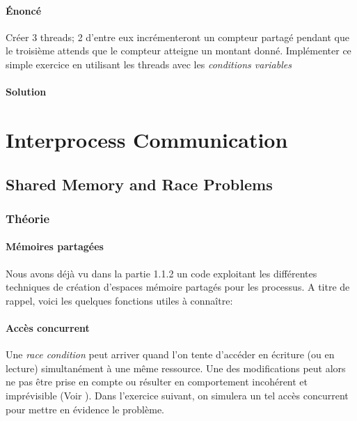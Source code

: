 \documentclass[a4paper, 12pt]{article}
\begin{document}
\paragraph{Énoncé\\}

Créer 3 threads; 2 d'entre eux incrémenteront un compteur partagé pendant que le troisième attends que le compteur atteigne un montant donné.
Implémenter ce simple exercice en utilisant les threads avec les \emph{conditions variables}

\paragraph{Solution\\}




\section{Interprocess Communication}

\subsection{Shared Memory and Race Problems}

\subsubsection{Théorie}

\paragraph{Mémoires partagées\\}
Nous avons déjà vu dans la partie 1.1.2 un code exploitant les différentes techniques de création d'espaces mémoire partagés pour les processus. A titre de rappel, voici les quelques fonctions utiles à connaître:



\paragraph{Accès concurrent\\}

Une \emph{race condition} peut arriver quand l'on tente d'accéder en écriture (ou en lecture) simultanément à une même ressource. Une des modifications peut alors ne pas être prise en compte ou résulter en comportement incohérent et imprévisible (Voir ). Dans l'exercice suivant, on simulera un tel accès concurrent pour mettre en évidence le problème.
\end{document}
